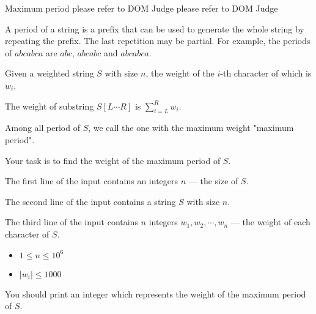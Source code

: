 \gdef\thisproblemauthor{}
\gdef\thisproblemdeveloper{}
\gdef\thisproblemorigin{}
\begin{problem}{Maximum period}
{}{}
{please refer to DOM Judge}
{please refer to DOM Judge}
{}

A period of a string is a prefix that can be used to generate the whole string by repeating the prefix. The last repetition may be partial. For example, the periods of $abcabca$ are $abc$, $abcabc$ and $abcabca$.

Given a weighted string $S$ with size $n$, the weight of the $i$-th character of which is $w_i$.

The weight of substring $S[L\cdots R]$ is $\sum_{i=L}^{R} w_i$.

Among all period of $S$, we call the one with the maximum weight "maximum period".

Your task is to find the weight of the maximum period of $S$.

\InputFile
The first line of the input contains an integers $n$ --- the size of $S$.

The second line of the input contains a string $S$ with size $n$.

The third line of the input contains $n$ integers $w_1, w_2,\cdots, w_n$ --- the weight of each character of $S$.

\begin{itemize}
  \item $1 \leq n \leq 10^6$
  \item $|w_i| \leq 1000$
\end{itemize}

\OutputFile

You should print an integer which represents the weight of the maximum period of $S$.

\Examples

\begin{example}
%
%
\end{example}

\end{problem}
